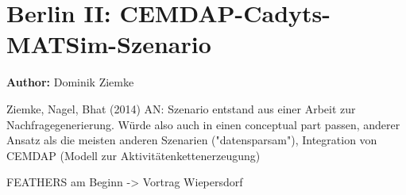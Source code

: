 \section{Berlin II: CEMDAP-Cadyts-MATSim-Szenario}
\label{ch:scenarios:berlinII}
\hfill \textbf{Author:} Dominik Ziemke

Ziemke, Nagel, Bhat (2014)
AN: Szenario entstand aus einer Arbeit zur Nachfragegenerierung. Würde also auch in einen conceptual part passen, anderer Ansatz als die meisten anderen Szenarien ("datensparsam"), Integration von CEMDAP (Modell zur Aktivitätenkettenerzeugung)


FEATHERS am Beginn -> Vortrag Wiepersdorf


